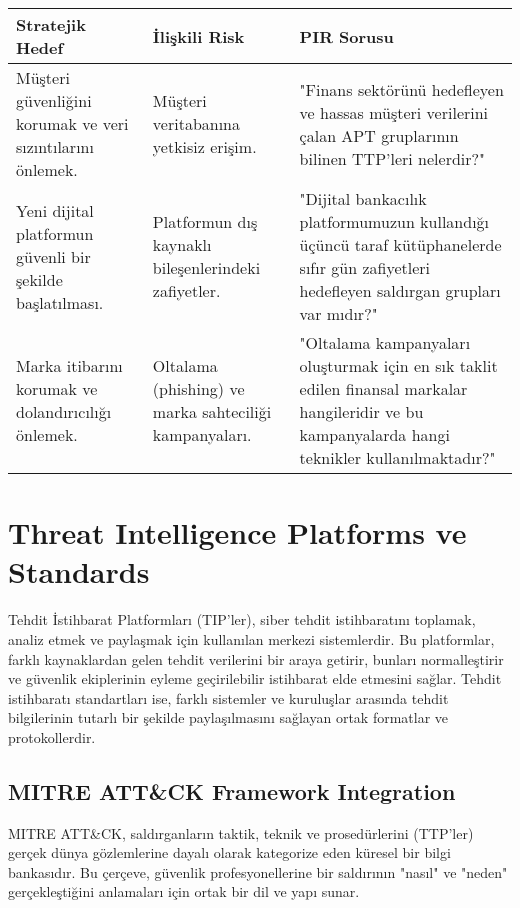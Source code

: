 \begin{tabularx}{\textwidth}{|l|X|X|}
\hline
\textbf{Stratejik Hedef} & \textbf{İlişkili Risk} & \textbf{PIR Sorusu} \\
\hline
Müşteri güvenliğini korumak ve veri sızıntılarını önlemek. & Müşteri veritabanına yetkisiz erişim. & "Finans sektörünü hedefleyen ve hassas müşteri verilerini çalan APT gruplarının bilinen TTP'leri nelerdir?" \\
\hline
Yeni dijital platformun güvenli bir şekilde başlatılması. & Platformun dış kaynaklı bileşenlerindeki zafiyetler. & "Dijital bankacılık platformumuzun kullandığı üçüncü taraf kütüphanelerde sıfır gün zafiyetleri hedefleyen saldırgan grupları var mıdır?" \\
\hline
Marka itibarını korumak ve dolandırıcılığı önlemek. & Oltalama (phishing) ve marka sahteciliği kampanyaları. & "Oltalama kampanyaları oluşturmak için en sık taklit edilen finansal markalar hangileridir ve bu kampanyalarda hangi teknikler kullanılmaktadır?" \\
\hline
\end{tabularx}

\section{Threat Intelligence Platforms ve Standards}

Tehdit İstihbarat Platformları (TIP'ler), siber tehdit istihbaratını toplamak, analiz etmek ve paylaşmak için kullanılan merkezi sistemlerdir. Bu platformlar, farklı kaynaklardan gelen tehdit verilerini bir araya getirir, bunları normalleştirir ve güvenlik ekiplerinin eyleme geçirilebilir istihbarat elde etmesini sağlar. Tehdit istihbaratı standartları ise, farklı sistemler ve kuruluşlar arasında tehdit bilgilerinin tutarlı bir şekilde paylaşılmasını sağlayan ortak formatlar ve protokollerdir.

\subsection{MITRE ATT\&CK Framework Integration}

MITRE ATT\&CK, saldırganların taktik, teknik ve prosedürlerini (TTP'ler) gerçek dünya gözlemlerine dayalı olarak kategorize eden küresel bir bilgi bankasıdır. Bu çerçeve, güvenlik profesyonellerine bir saldırının "nasıl" ve "neden" gerçekleştiğini anlamaları için ortak bir dil ve yapı sunar.

